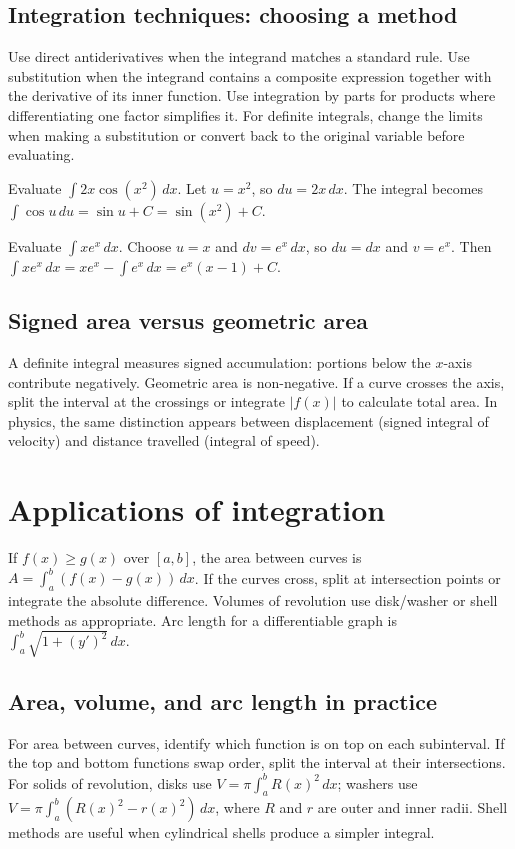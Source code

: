 \documentclass[12pt,a4paper]{article}
\begin{document}
\subsection{Integration techniques: choosing a method}
Use direct antiderivatives when the integrand matches a standard rule. Use substitution when the integrand contains a composite expression together with the derivative of its inner function. Use integration by parts for products where differentiating one factor simplifies it. For definite integrals, change the limits when making a substitution or convert back to the original variable before evaluating.

\begin{exampleBox}Evaluate $\int 2x\cos(x^2)\,dx$. Let $u=x^2$, so $du=2x\,dx$. The integral becomes $\int\cos u\,du=\sin u+C=\sin(x^2)+C$.
\end{exampleBox}

\begin{exampleBox}Evaluate $\int xe^x\,dx$. Choose $u=x$ and $dv=e^x\,dx$, so $du=dx$ and $v=e^x$. Then $\int xe^x\,dx=xe^x-\int e^x\,dx=e^x(x-1)+C$.
\end{exampleBox}

\subsection{Signed area versus geometric area}
A definite integral measures signed accumulation: portions below the $x$-axis contribute negatively. Geometric area is non-negative. If a curve crosses the axis, split the interval at the crossings or integrate $|f(x)|$ to calculate total area. In physics, the same distinction appears between displacement (signed integral of velocity) and distance travelled (integral of speed).

\section{Applications of integration}
If $f(x)\ge g(x)$ over $[a,b]$, the area between curves is $A=\int_a^b(f(x)-g(x))\,dx$. If the curves cross, split at intersection points or integrate the absolute difference. Volumes of revolution use disk/washer or shell methods as appropriate. Arc length for a differentiable graph is $\int_a^b\sqrt{1+(y')^2}\,dx$.
\subsection{Area, volume, and arc length in practice}
For area between curves, identify which function is on top on each subinterval. If the top and bottom functions swap order, split the interval at their intersections. For solids of revolution, disks use $V=\pi\int_a^b R(x)^2\,dx$; washers use $V=\pi\int_a^b(R(x)^2-r(x)^2)\,dx$, where $R$ and $r$ are outer and inner radii. Shell methods are useful when cylindrical shells produce a simpler integral.
\end{document}

